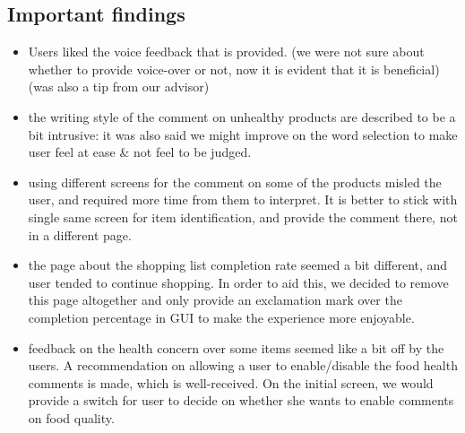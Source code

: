 \subsection{Important findings}

	\begin{itemize}
		\item Users liked the voice feedback that is provided. (we were not sure about whether to provide voice-over or not, now it is evident that it is beneficial) (was also a tip from our advisor)
		\item the writing style of the comment on unhealthy products are described to be a bit intrusive: it was also said we might improve on the word selection to make user feel at ease \& not feel to be judged.
		\item using different screens for the comment on some of the products misled the user, and required more time from them to interpret. It is better to stick with single same screen for item identification, and provide the comment there, not in a different page.
		\item the page about the shopping list completion rate seemed a bit different, and user tended to continue shopping. In order to aid this, we decided to remove this page altogether and only provide an exclamation mark over the completion percentage in GUI to make the experience more enjoyable.
		\item feedback on the health concern over some items seemed like a bit off by the users. A recommendation on allowing a user to enable/disable the food health comments is made, which is well-received. On the initial screen, we would provide a switch for user to decide on whether she wants to enable comments on food quality.
	\end{itemize}

